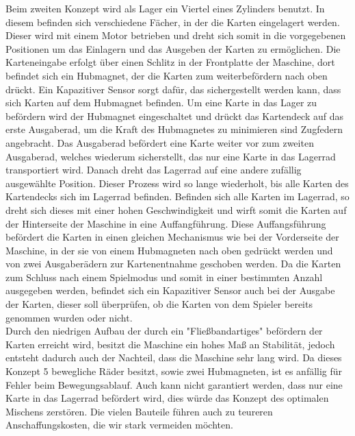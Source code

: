 Beim zweiten Konzept wird als Lager ein Viertel eines Zylinders benutzt. In diesem befinden
sich verschiedene Fächer, in der die Karten eingelagert werden. Dieser wird mit einem Motor betrieben
und dreht sich somit in die vorgegebenen Positionen um das Einlagern und das Ausgeben der Karten zu ermöglichen.
Die Karteneingabe erfolgt über einen Schlitz in der Frontplatte der Maschine, dort befindet sich ein Hubmagnet, der die Karten
zum weiterbefördern nach oben drückt. Ein Kapazitiver Sensor sorgt dafür, das sichergestellt werden kann, dass sich Karten auf dem Hubmagnet befinden.
Um eine Karte in das Lager zu befördern wird der Hubmagnet eingeschaltet und drückt das Kartendeck auf das erste Ausgaberad, um die Kraft des Hubmagnetes zu minimieren sind Zugfedern angebracht.
Das Ausgaberad befördert eine Karte weiter vor zum zweiten Ausgaberad, welches wiederum sicherstellt, das nur eine Karte in das Lagerrad transportiert wird.
Danach dreht das Lagerrad auf eine andere zufällig ausgewählte Position. Dieser Prozess wird so lange wiederholt, bis alle Karten des Kartendecks sich im Lagerrad befinden.
Befinden sich alle Karten im Lagerrad, so dreht sich dieses mit einer hohen Geschwindigkeit und wirft somit die Karten auf der Hinterseite der Maschine in eine Auffangführung. %
Diese Auffangsführung befördert die Karten in einen gleichen Mechanismus wie bei der Vorderseite der Maschine, in der sie von einem Hubmagneten nach oben gedrückt werden und von zwei Ausgaberädern zur
Kartenentnahme geschoben werden. Da die Karten zum Schluss nach einem Spielmodus und somit in einer bestimmten Anzahl ausgegeben werden, befindet sich ein Kapazitiver Sensor auch bei der Ausgabe der Karten,
dieser soll überprüfen, ob die Karten von dem Spieler bereits genommen wurden oder nicht.\\

Durch den niedrigen Aufbau der durch ein "Fließbandartiges" befördern der Karten erreicht wird, besitzt die Maschine ein hohes Maß an Stabilität, jedoch entsteht dadurch auch der Nachteil, dass die Maschine sehr lang wird. Da dieses
Konzept 5 bewegliche Räder besitzt, sowie zwei Hubmagneten, ist es anfällig für Fehler beim Bewegungsablauf. Auch kann nicht garantiert werden, dass nur eine Karte in das Lagerrad befördert wird, dies würde das Konzept des optimalen
Mischens zerstören. Die vielen Bauteile führen auch zu teureren Anschaffungskosten, die wir stark vermeiden möchten.\\

